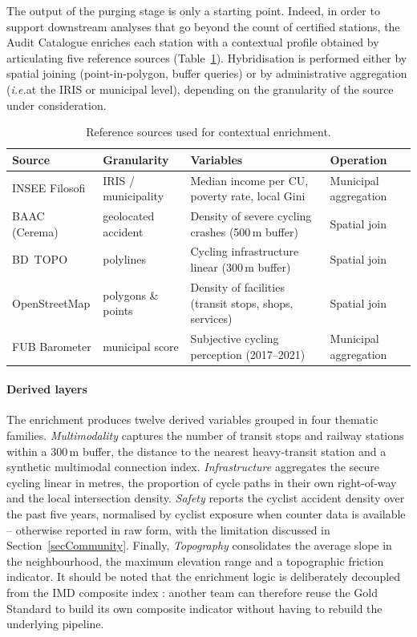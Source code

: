 \documentclass[a4paper,twoside]{article}
\newcommand{\ie}{\emph{i.e.}}
\begin{document}
The output of the purging stage is only a starting point. Indeed,
in order to support downstream analyses that go beyond the count
of certified stations, the Audit Catalogue enriches each station
with a contextual profile obtained by articulating five reference
sources (Table~\ref{tab:sources}). Hybridisation is performed
either by spatial joining (point-in-polygon, buffer queries) or
by administrative aggregation (\ie at the IRIS or municipal
level), depending on the granularity of the source under
consideration.

\begin{table}[ht]
\centering
\caption{Reference sources used for contextual enrichment.}
\label{tab:sources}
\small
\begin{tabular}{@{}llll@{}}
\toprule
\textbf{Source} & \textbf{Granularity} & \textbf{Variables} &
\textbf{Operation}\\
\midrule
INSEE Filosofi & IRIS / municipality &
   Median income per CU, poverty rate, local Gini &
   Municipal aggregation\\
BAAC (Cerema)  & geolocated accident &
   Density of severe cycling crashes (500\,m buffer) &
   Spatial join\\
BD~TOPO        & polylines &
   Cycling infrastructure linear (300\,m buffer) &
   Spatial join\\
OpenStreetMap  & polygons \& points &
   Density of facilities (transit stops, shops, services) &
   Spatial join\\
FUB Barometer  & municipal score &
   Subjective cycling perception (2017--2021) &
   Municipal aggregation\\
\bottomrule
\end{tabular}
\end{table}

\paragraph{Derived layers}
The enrichment produces twelve derived variables grouped in four
thematic families. \emph{Multimodality} captures the number of
transit stops and railway stations within a 300\,m buffer, the
distance to the nearest heavy-transit station and a synthetic
multimodal connection index. \emph{Infrastructure} aggregates
the secure cycling linear in metres, the proportion of cycle
paths in their own right-of-way and the local intersection
density. \emph{Safety} reports the cyclist accident density over
the past five years, normalised by cyclist exposure when counter
data is available -- otherwise reported in raw form, with the
limitation discussed in Section~\ref{secCommunity}. Finally,
\emph{Topography} consolidates the average slope in the
neighbourhood, the maximum elevation range and a topographic
friction indicator. It should be noted that the enrichment logic
is deliberately decoupled from the IMD composite index
\cite{Fosse2026imd}: another team can therefore reuse the Gold
Standard to build its own composite indicator without having to
rebuild the underlying pipeline.
\end{document}
